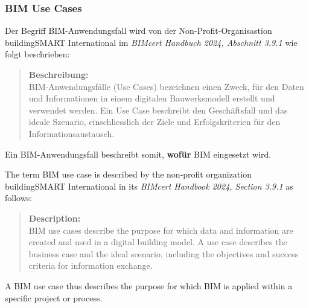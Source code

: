 \subsubsection{BIM Use Cases}
\begin{German}    
    Der Begriff BIM-Anwendungsfall wird von der Non-Profit-Organisastion buildingSMART International im \textit{BIMcert Handbuch 2024, Abschnitt 3.9.1} wie folgt beschrieben:

    \begin{quote}
        \textbf{Beschreibung:}\\
        BIM-Anwendungsfälle (Use Cases) bezeichnen einen Zweck, für den Daten und Informationen in einem digitalen Bauwerksmodell erstellt und verwendet werden. Ein Use Case beschreibt den Geschäftsfall und das ideale Szenario, einschliesslich der Ziele und Erfolgskriterien für den Informationsaustausch.
    \end{quote}

    Ein BIM-Anwendungsfall beschreibt somit, \textbf{wofür} BIM eingesetzt wird.
\end{German}

\begin{English}
    The term BIM use case is described by the non-profit organization buildingSMART International in its \textit{BIMcert Handbook 2024, Section 3.9.1} as follows:

    \begin{quote}
        \textbf{Description:}\\
        BIM use cases describe the purpose for which data and information are created and used in a digital building model. A use case describes the business case and the ideal scenario, including the objectives and success criteria for information exchange.
    \end{quote}

    A BIM use case thus describes the purpose for which BIM is applied within a specific project or process.
\end{English}

